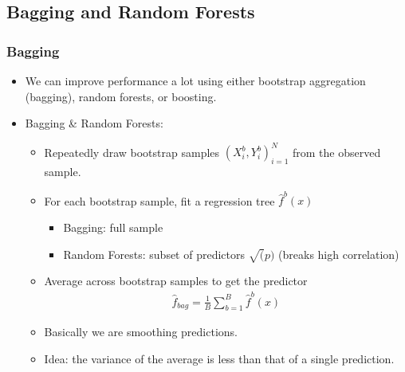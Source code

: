 \documentclass[
  shownotes,
  xcolor={svgnames},
  hyperref={colorlinks,citecolor=DarkBlue,linkcolor=DarkRed,urlcolor=DarkBlue}
  , aspectratio=169]{beamer}
\begin{document}
\subsection{Bagging and Random Forests }
\begin{frame}[fragile]
\frametitle{Bagging}

\begin{itemize}
  \item We can improve performance a lot using either bootstrap aggregation (bagging), random forests, or boosting.
  \item Bagging \& Random Forests:
    \begin{itemize}
      \item Repeatedly draw bootstrap samples $(X_i^b,Y_i^b)_{i=1}^N$ from the observed sample.
      \item For each bootstrap sample, fit a regression tree $\hat{f}^b(x)$
      \begin{itemize}
        \item Bagging: full sample
        \item Random Forests: subset of predictors $ \sqrt(p)$ (breaks high correlation)
      \end{itemize}
      \item Average across bootstrap samples to get the predictor
      \begin{align}
        \hat{f}_{bag} =\frac{1}{B}\sum_{b=1}^B \hat{f}^b(x)
      \end{align}
\item Basically we are smoothing predictions. 
\item Idea: the variance of the average is less than that of a single prediction.
\end{itemize}

\end{itemize}

\end{frame}
\end{document}
